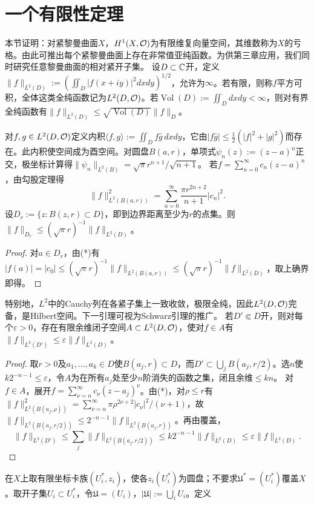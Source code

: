 \section{一个有限性定理}
本节证明：对紧黎曼曲面$X$，$H^1(X,\mathcal O)$为有限维复向量空间，其维数称为$X$的亏格。由此可推出每个紧黎曼曲面上存在非常值亚纯函数。为供第三章应用，我们同时研究任意黎曼曲面的相对紧开子集。
设$D\subset\mathbb C$开，定义$\|f\|_{L^2(D)}:=(\iint_D|f(x+iy)|^2dxdy)^{1/2}$，允许为$\infty$。若有限，则称$f$平方可积，全体这类全纯函数记为$L^2(D,\mathcal O)$。若$\operatorname{Vol}(D):=\iint_Ddxdy<\infty$，则对有界全纯函数有$\|f\|_{L^2(D)}\le\sqrt{\operatorname{Vol}(D)}\|f\|_D$。

对$f,g\in L^2(D,\mathcal O)$定义内积$\langle f,g\rangle:=\iint_Df\bar g\,dxdy$，它由$|f\bar g|\le\tfrac12(|f|^2+|g|^2)$而存在。此内积使空间成为酉空间。对圆盘$B(a,r)$，单项式$\psi_n(z):=(z-a)^n$正交，极坐标计算得$\|\psi_n\|_{L^2(B)}=\sqrt\pi r^{n+1}/\sqrt{n+1}$。
若$f=\sum_{n=0}^\infty c_n(z-a)^n$，由勾股定理得
\begin{equation}\|f\|_{L^2(B(a,r))}^2=\sum_{n=0}^\infty\frac{\pi r^{2n+2}}{n+1}|c_n|^2.\tag{*}\end{equation}
设$D_r:=\{z:B(z,r)\subset D\}$，即到边界距离至少为$r$的点集。则$\|f\|_{D_r}\le(\sqrt\pi r)^{-1}\|f\|_{L^2(D)}$。
\begin{proof}
对$a\in D_r$，由(*)有$|f(a)|=|c_0|\le(\sqrt\pi r)^{-1}\|f\|_{L^2(B(a,r))}\le(\sqrt\pi r)^{-1}\|f\|_{L^2(D)}$，取上确界即得。
\end{proof}
特别地，$L^2$中的Cauchy列在各紧子集上一致收敛，极限全纯，因此$L^2(D,\mathcal O)$完备，是Hilbert空间。下一引理可视为Schwarz引理的推广。
若$D'\Subset D$开，则对每个$\varepsilon>0$，存在有限余维闭子空间$A\subset L^2(D,\mathcal O)$，使对$f\in A$有$\|f\|_{L^2(D')}\le\varepsilon\|f\|_{L^2(D)}$。
\begin{proof}
取$r>0$及$a_1,\ldots,a_k\in D$使$B(a_j,r)\subset D$，而$D'\subset\bigcup_jB(a_j,r/2)$。选$n$使$k2^{-n-1}\le\varepsilon$，令$A$为在所有$a_j$处至少$n$阶消失的函数之集，闭且余维$\le kn$。
对$f\in A$，展开$f=\sum_{\nu=n}^\infty c_\nu(z-a_j)^\nu$。由(*)，对$\rho\le r$有$\|f\|_{L^2(B(a_j,\rho))}^2=\sum_{\nu=n}^\infty\pi\rho^{2\nu+2}|c_\nu|^2/(\nu+1)$，故$\|f\|_{L^2(B(a_j,r/2))}\le2^{-n-1}\|f\|_{L^2(B(a_j,r))}$。再由覆盖，
\[
\|f\|_{L^2(D')}\le\sum_j\|f\|_{L^2(B(a_j,r/2))}\le k2^{-n-1}\|f\|_{L^2(D)}\le\varepsilon\|f\|_{L^2(D)}.
\]
\end{proof}
在$X$上取有限坐标卡族$(U_i^*,z_i)$，使各$z_i(U_i^*)$为圆盘；不要求$\mathfrak U^*=(U_i^*)$覆盖$X$。取开子集$U_i\subset U_i^*$，令$\mathfrak U=(U_i)$，$|\mathfrak U|:=\bigcup_iU_i$。定义
